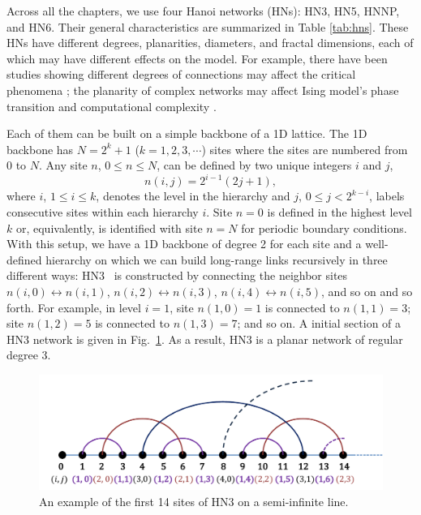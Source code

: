 Across all the chapters, we use four Hanoi networks (HNs): HN3, HN5, HNNP, and HN6. Their general characteristics are summarized in Table \ref{tab:hns}. These HNs have different degrees, planarities, diameters, and fractal dimensions, each of which may have different effects on the model. For example, there have been studies showing different degrees of connections may affect the critical phenomena \cite{dorogovtsev2008critical, herrero2002ising}; the planarity of complex networks may affect Ising model's phase transition \cite{fisher1966dimer, istrail2000statistical} and computational complexity \cite{barahona1982}.


Each of them can be built on
a simple backbone of a 1D lattice. The 1D backbone has $N=2^{k}+1$
($k=1,2,3,\cdots$) sites where the sites are numbered from $0$ to
$N$. Any site $n$, $0\le n\le N$, can be defined by two unique
integers $i$ and $j$, 
\begin{equation}
n(i,j)=2^{i-1}(2j+1),\label{eq:numbering}
\end{equation}
where $i$, $1\le i\le k$, denotes the level in the hierarchy and
$j$, $0\le j<2^{k-i}$, labels consecutive sites within each
hierarchy $i$. Site $n=0$ is defined in the highest level $k$ or,
equivalently, is identified with site $n=N$ for periodic boundary
conditions. With this setup, we have a 1D backbone of degree
2 for each site and a well-defined hierarchy on which we can build
long-range links recursively in three different ways: HN3~\cite{Boettcher2008HN}
is constructed by connecting the neighbor sites $n(i,0)\longleftrightarrow n(i,1)$,
$n(i,2)\longleftrightarrow n(i,3)$, $n(i,4)\longleftrightarrow n(i,5)$,
and so on and so forth. For example, in level $i=1$, site $n(1,0)=1$
is connected to $n(1,1)=3$; site $n(1,2)=5$ is connected to $n(1,3)=7$;
and so on. A initial section of a HN3 network is given in Fig.~\ref{fig:HN3_short}.
As a result, HN3 is a planar network of regular degree 3.

\begin{figure}
\centering \includegraphics[width=1\columnwidth]{Chapter-1/HN3_short.pdf} 
\protect\caption{\label{fig:HN3_short} An example of the first 14 sites of HN3 on a semi-infinite line.}
\end{figure}


